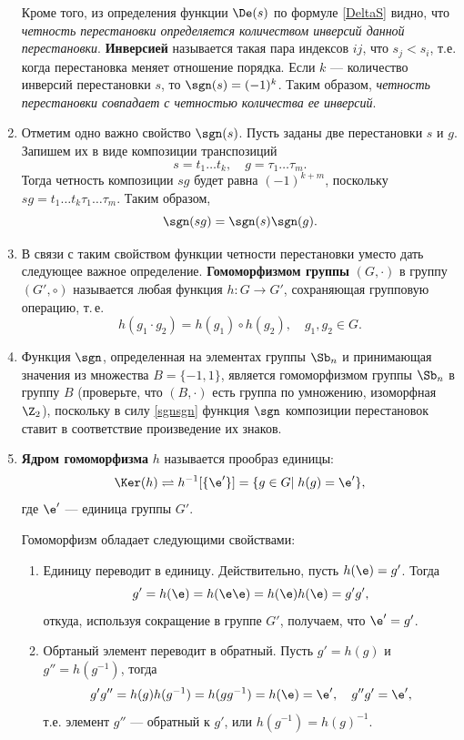 \begin{enumerate}
Кроме того, из определения функции $\De(s)$ по формуле \eqref{DeltaS} видно, что \textit{четность перестановки  определяется количеством инверсий данной перестановки}. \textbf{Инверсией} называется такая пара индексов $ij$, что $s_j<s_i$, т.е. когда перестановка меняет отношение порядка. Если $k$ --- количество инверсий перестановки $s$, то $\sgn(s)=(-1)^k$. Таким образом, \textit{четность перестановки совпадает с четностью количества ее инверсий}.




\item Отметим одно важно свойство $\sgn(s)$. Пусть заданы две перестановки $s$ и $g$. Запишем их в виде композиции транспозиций
$$
s=t_1\dots t_k,\quad g=\tau_1\dots\tau_m.
$$
Тогда четность композиции $sg$ будет равна $(-1)^{k+m}$, поскольку $sg=t_1\dots t_k\tau_1\dots\tau_m$. Таким образом,
\begin{equation}\label{sgnsgn}
\sgn(sg)=\sgn(s)\sgn(g).
\end{equation}
\item В связи с таким свойством функции четности перестановки уместо дать следующее важное определение.
\textbf{Гомоморфизмом группы} $(G,\cdot)$ в группу $(G',\circ)$ называется любая функция $h:G\to G'$, сохраняющая групповую операцию, т.\,е.
$$
h(g_1\cdot g_2)=h(g_1)\circ h(g_2),\quad g_1,g_2\in G.
$$

\item Функция $\sgn$, определенная на элементах группы $\Sb_n$ и принимающая значения из множества $B=\{-1,1\}$, является гомоморфизмом группы $\Sb_n$ в группу $B$ (проверьте, что $(B,\cdot)$ есть группа по умножению, изоморфная $\Z_2$), поскольку в силу \eqref{sgnsgn} функция $\sgn$ композиции перестановок ставит в соответствие произведение их знаков.

\item \textbf{Ядром гомоморфизма} $h$ называется прообраз единицы:
$$
\Ker(h)\rightleftharpoons h^{-1}[\{\e'\}]=\{g\in G|\;h(g)=\e'\},
$$
где $\e'$ --- единица группы $G'$.

Гомоморфизм обладает следующими свойствами:
\begin{enumerate}[\bf Hom1]
\item Единицу переводит в единицу. Действительно, пусть $h(\e)=g'$. Тогда
$$
g'=h(\e)=h(\e\e)=h(\e)h(\e)=g'g',
$$
откуда, используя сокращение в группе $G'$, получаем, что $\e'=g'$.

\item Обртаный элемент переводит в обратный. Пусть $g'=h(g)$ и $g''=h(g^{-1})$, тогда
$$
g'g'' = h(g)h(g^{-1})=h(gg^{-1})=h(\e)=\e',\quad g''g'=\e',
$$
т.е. элемент $g''$ --- обратный к $g'$, или $h(g^{-1})=h(g)^{-1}$.


\end{enumerate}
\end{enumerate}
